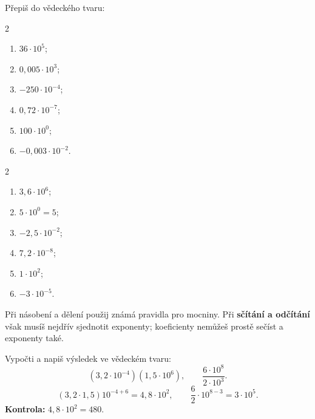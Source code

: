 \documentclass[11pt,a4paper]{article}
\begin{document}
\begin{zadaniReseniBox}[breakable=false,title={Samostatná práce 2: oprav nenormalizovaný zápis}]
Přepiš do vědeckého tvaru:
\begin{multicols}{2}
\begin{enumerate}[label=\alph*)]
\item $36\cdot10^5$;
\item $0{,}005\cdot10^3$;
\item $-250\cdot10^{-4}$;
\item $0{,}72\cdot10^{-7}$;
\item $100\cdot10^0$;
\item $-0{,}003\cdot10^{-2}$.
\end{enumerate}
\end{multicols}
\tcblower
\begin{multicols}{2}
\begin{enumerate}[label=\alph*)]
\item $3{,}6\cdot10^6$;
\item $5\cdot10^0=5$;
\item $-2{,}5\cdot10^{-2}$;
\item $7{,}2\cdot10^{-8}$;
\item $1\cdot10^2$;
\item $-3\cdot10^{-5}$.
\end{enumerate}
\end{multicols}
\end{zadaniReseniBox}

Při násobení a dělení použij známá pravidla pro mocniny. Při
\textbf{sčítání a odčítání} však musíš nejdřív sjednotit exponenty;
koeficienty nemůžeš prostě sečíst a exponenty také.
\begin{prikladReseniBox}[breakable=false,title={Příklad 3: násobení a dělení bez velkých čísel}]
Vypočti a napiš výsledek ve vědeckém tvaru:
\[
(3{,}2\cdot10^{-4})(1{,}5\cdot10^6),\qquad
\frac{6\cdot10^8}{2\cdot10^3}.
\]
\tcblower
\[
(3{,}2\cdot1{,}5)10^{-4+6}=4{,}8\cdot10^2,\qquad
\frac62\cdot10^{8-3}=3\cdot10^5.
\]
\textbf{Kontrola:} $4{,}8\cdot10^2=480$.
\end{prikladReseniBox}
\end{document}
